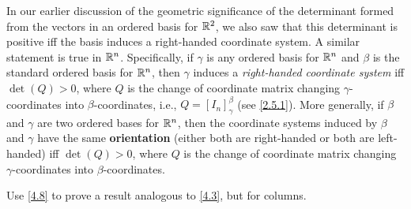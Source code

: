\begin{note}
	In our earlier discussion of the geometric significance of the determinant formed from the vectors in an ordered basis for \(\mathbb{R}^2\), we also saw that this determinant is positive iff the basis induces a right-handed coordinate system.
	A similar statement is true in \(\mathbb{R}^n\).
	Specifically, if \(\gamma\) is any ordered basis for \(\mathbb{R}^n\) and \(\beta\) is the standard ordered basis for \(\mathbb{R}^n\), then \(\gamma\) induces a \emph{right-handed coordinate system} iff \(\det(Q) > 0\), where \(Q\) is the change of coordinate matrix changing \(\gamma\)-coordinates into \(\beta\)-coordinates, i.e., \(Q = [I_n]_{\gamma}^{\beta}\)
	(see \cref{2.5.1}).
	More generally, if \(\beta\) and \(\gamma\) are two ordered bases for \(\mathbb{R}^n\), then the coordinate systems induced by \(\beta\) and \(\gamma\) have the same \textbf{orientation} (either both are right-handed or both are left-handed) iff \(\det(Q) > 0\), where \(Q\) is the change of coordinate matrix changing \(\gamma\)-coordinates into \(\beta\)-coordinates.
\end{note}

\exercisesection

\setcounter{ex}{7}
\begin{ex}\label{ex:4.3.8}
	Use \cref{4.8} to prove a result analogous to \cref{4.3}, but for columns.
\end{ex}

